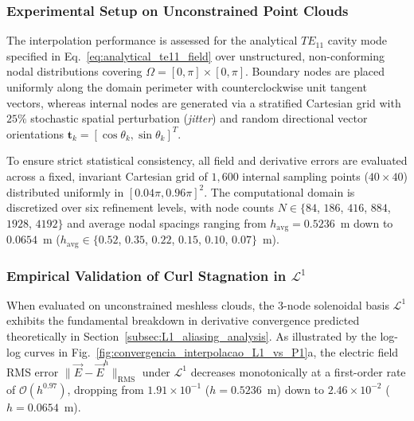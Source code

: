 \documentclass[preprint,12pt]{elsarticle}
\begin{document}
\subsubsection{Experimental Setup on Unconstrained Point Clouds}
The interpolation performance is assessed for the analytical $TE_{11}$ cavity mode specified in Eq.~\eqref{eq:analytical_te11_field} over unstructured, non-conforming nodal distributions covering $\Omega = [0, \pi] \times [0, \pi]$. Boundary nodes are placed uniformly along the domain perimeter with counterclockwise unit tangent vectors, whereas internal nodes are generated via a stratified Cartesian grid with $25\%$ stochastic spatial perturbation (\textit{jitter}) and random directional vector orientations $\mathbf{t}_k = [\cos\theta_k, \sin\theta_k]^T$.

To ensure strict statistical consistency, all field and derivative errors are evaluated across a fixed, invariant Cartesian grid of $1{,}600$ internal sampling points ($40 \times 40$) distributed uniformly in $[0.04\pi, 0.96\pi]^2$. The computational domain is discretized over six refinement levels, with node counts $N \in \{84$, $186$, $416$, $884$, $1928$, $4192\}$ and average nodal spacings ranging from $h_{\mathrm{avg}} = 0.5236$~m down to $0.0654$~m ($h_{\mathrm{avg}} \in \{0.52$, $0.35$, $0.22$, $0.15$, $0.10$, $0.07\}$~m).

\subsubsection{Empirical Validation of Curl Stagnation in $\mathcal{L}^1$}
When evaluated on unconstrained meshless clouds, the 3-node solenoidal basis $\mathcal{L}^1$ exhibits the fundamental breakdown in derivative convergence predicted theoretically in Section~\ref{subsec:L1_aliasing_analysis}. As illustrated by the log-log curves in Fig.~\ref{fig:convergencia_interpolacao_L1_vs_P1}a, the electric field RMS error $\|\vec{E} - \vec{E}^h\|_{\mathrm{RMS}}$ under $\mathcal{L}^1$ decreases monotonically at a first-order rate of $\mathcal{O}(h^{0.97})$, dropping from $1.91 \times 10^{-1}$ ($h = 0.5236$~m) down to $2.46 \times 10^{-2}$ ($h = 0.0654$~m).
\end{document}
